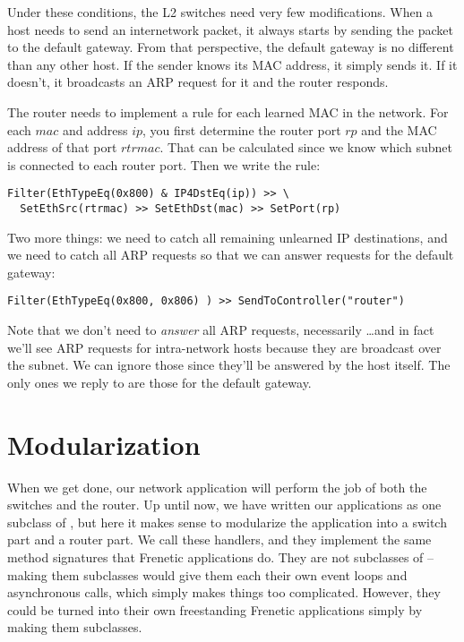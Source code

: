 Under these conditions, the L2 switches need very few modifications.  When a host needs to send an 
internetwork packet, it always starts by sending the packet to the default gateway.  From that 
perspective, the default gateway is no different than any other host.  If the sender knows 
its MAC address, it simply sends it.  If it doesn't, it broadcasts an ARP request for it and the
router responds.  

The router needs to implement a rule for each learned MAC in the network.  For each
$mac$ and address $ip$, you first determine the router port $rp$ and the MAC address of that
port $rtrmac$.  That can be calculated since
we know which subnet is connected to each router port.  Then we write the rule:

\begin{verbatim}
Filter(EthTypeEq(0x800) & IP4DstEq(ip)) >> \
  SetEthSrc(rtrmac) >> SetEthDst(mac) >> SetPort(rp) 
\end{verbatim}

Two more things: we need to catch all remaining unlearned IP destinations, and 
we need to catch all ARP requests so that we can answer requests for the default gateway:

\begin{verbatim}
Filter(EthTypeEq(0x800, 0x806) ) >> SendToController("router") 
\end{verbatim}

Note that we don't need to \emph{answer} all ARP requests, necessarily \ldots and in fact we'll see
ARP requests for intra-network hosts because they are broadcast over the subnet.  We can ignore those
since they'll be answered by the host itself.  The only ones we reply to are those for the default 
gateway.  

\section{Modularization}

When we get done, our network application will perform the job of both the switches and the router.  
Up until now, we have written our applications as one subclass of \python{Frenetic.App}, but here
it makes sense to modularize the application into a switch part and a router part.  We call these
handlers, and they implement the same method signatures that Frenetic applications do.  
They are not subclasses of \python{Frenetic.App} -- making them subclasses would give them each 
their own event loops and asynchronous calls, which simply makes things too complicated.   However, they
could be turned into their own freestanding Frenetic applications simply by making them subclasses.

